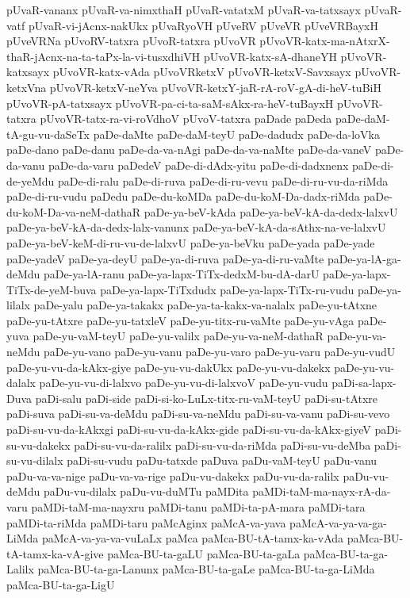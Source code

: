 {pUvaR-vananx
pUvaR-va-nimxthaH
pUvaR-vatatxM
pUvaR-va-tatxsayx
pUvaR-vatf
pUvaR-vi-jAcnx-nakUkx
pUvaRyoVH
pUveRV
pUveVR
pUveVRBayxH
pUveVRNa
pUvoRV-tatxra
pUvoR-tatxra
pUvoVR
pUvoVR-katx-ma-nAtxrX-thaR-jAcnx-na-ta-taPx-la-vi-tusxdhiVH
pUvoVR-katx-sA-dhaneYH
pUvoVR-katxsayx
pUvoVR-katx-vAda
pUvoVRketxV
pUvoVR-ketxV-Savxsayx
pUvoVR-ketxVna
pUvoVR-ketxV-neYva
pUvoVR-ketxY-jaR-rA-roV-gA-di-heV-tuBiH
pUvoVR-pA-tatxsayx
pUvoVR-pa-ci-ta-saM-sAkx-ra-heV-tuBayxH
pUvoVR-tatxra
pUvoVR-tatx-ra-vi-roVdhoV
pUvoV-tatxra
paDade
paDeda
paDe-daM-tA-gu-vu-daSeTx
paDe-daMte
paDe-daM-teyU
paDe-dadudx
paDe-da-loVka
paDe-dano
paDe-danu
paDe-da-va-nAgi
paDe-da-va-naMte
paDe-da-vaneV
paDe-da-vanu
paDe-da-varu
paDedeV
paDe-di-dAdx-yitu
paDe-di-dadxnenx
paDe-di-de-yeMdu
paDe-di-ralu
paDe-di-ruva
paDe-di-ru-vevu
paDe-di-ru-vu-da-riMda
paDe-di-ru-vudu
paDedu
paDe-du-koMDa
paDe-du-koM-Da-dadx-riMda
paDe-du-koM-Da-va-neM-dathaR
paDe-ya-beV-kAda
paDe-ya-beV-kA-da-dedx-lalxvU
paDe-ya-beV-kA-da-dedx-lalx-vanunx
paDe-ya-beV-kA-da-sAthx-na-ve-lalxvU
paDe-ya-beV-keM-di-ru-vu-de-lalxvU
paDe-ya-beVku
paDe-yada
paDe-yade
paDe-yadeV
paDe-ya-deyU
paDe-ya-di-ruva
paDe-ya-di-ru-vaMte
paDe-ya-lA-ga-deMdu
paDe-ya-lA-ranu
paDe-ya-lapx-TiTx-dedxM-bu-dA-darU
paDe-ya-lapx-TiTx-de-yeM-buva
paDe-ya-lapx-TiTxdudx
paDe-ya-lapx-TiTx-ru-vudu
paDe-ya-lilalx
paDe-yalu
paDe-ya-takakx
paDe-ya-ta-kakx-va-nalalx
paDe-yu-tAtxne
paDe-yu-tAtxre
paDe-yu-tatxleV
paDe-yu-titx-ru-vaMte
paDe-yu-vAga
paDe-yuva
paDe-yu-vaM-teyU
paDe-yu-valilx
paDe-yu-va-neM-dathaR
paDe-yu-va-neMdu
paDe-yu-vano
paDe-yu-vanu
paDe-yu-varo
paDe-yu-varu
paDe-yu-vudU
paDe-yu-vu-da-kAkx-giye
paDe-yu-vu-dakUkx
paDe-yu-vu-dakekx
paDe-yu-vu-dalalx
paDe-yu-vu-di-lalxvo
paDe-yu-vu-di-lalxvoV
paDe-yu-vudu
paDi-sa-lapx-Duva
paDi-salu
paDi-side
paDi-si-ko-LuLx-titx-ru-vaM-teyU
paDi-su-tAtxre
paDi-suva
paDi-su-va-deMdu
paDi-su-va-neMdu
paDi-su-va-vanu
paDi-su-vevo
paDi-su-vu-da-kAkxgi
paDi-su-vu-da-kAkx-gide
paDi-su-vu-da-kAkx-giyeV
paDi-su-vu-dakekx
paDi-su-vu-da-ralilx
paDi-su-vu-da-riMda
paDi-su-vu-deMba
paDi-su-vu-dilalx
paDi-su-vudu
paDu-tatxde
paDuva
paDu-vaM-teyU
paDu-vanu
paDu-va-va-nige
paDu-va-va-rige
paDu-vu-dakekx
paDu-vu-da-ralilx
paDu-vu-deMdu
paDu-vu-dilalx
paDu-vu-duMTu
paMDita
paMDi-taM-ma-nayx-rA-da-varu
paMDi-taM-ma-nayxru
paMDi-tanu
paMDi-ta-pA-mara
paMDi-tara
paMDi-ta-riMda
paMDi-taru
paMcAginx
paMcA-va-yava
paMcA-va-ya-va-ga-LiMda
paMcA-va-ya-va-vuLaLx
paMca
paMca-BU-tA-tamx-ka-vAda
paMca-BU-tA-tamx-ka-vA-give
paMca-BU-ta-gaLU
paMca-BU-ta-gaLa
paMca-BU-ta-ga-Lalilx
paMca-BU-ta-ga-Lanunx
paMca-BU-ta-gaLe
paMca-BU-ta-ga-LiMda
paMca-BU-ta-ga-LigU
}
